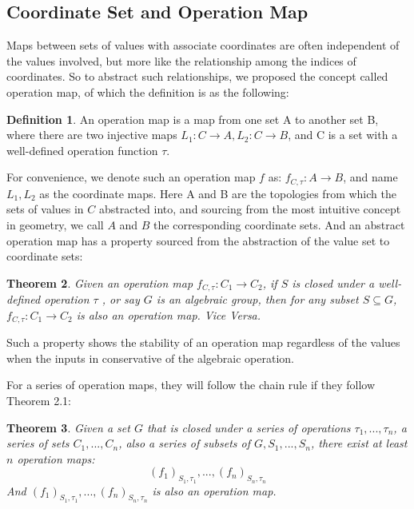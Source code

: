 \documentclass{amsart}
\newtheorem{theorem}{Theorem}[section]
\theoremstyle{definition}
\newtheorem{definition}[theorem]{Definition}
\theoremstyle{remark}
\numberwithin{equation}{section}
\begin{document}
\subsection{Coordinate Set and Operation Map}
Maps between sets of values with associate coordinates are often independent of the values involved, but more like the relationship among the indices of coordinates. So to abstract such relationships, we proposed the concept called operation map, of which the definition is as the following:
\begin{definition}
An operation map is a map from one set A to another set B, where there are two injective maps $L_1:C\to A, L_2:C\to B$, and C is a set with a well-defined operation function $\tau$.
\end{definition}
For convenience, we denote such an operation map $f$ as: $f_{C,\tau}:A\to B$, and name $L_1,L_2$ as the coordinate maps. Here A and B are the topologies from which the sets of values in $C$ abstracted into, and sourcing from the most intuitive concept in geometry, we call $A$ and $B$ the corresponding coordinate sets.
And an abstract operation map has a property sourced from the abstraction of the value set to coordinate sets:\
\begin{theorem}
Given an operation map $f_{C,\tau}:C_1\to C_2$, if $S$ is closed under a well-defined operation $\tau$ , or say $G$ is an algebraic group, then for any subset $S\subseteq G$, $f_{C,\tau}:C_1\to C_2$ is also an operation map. Vice Versa.
\end{theorem}
Such a property shows the stability of an operation map regardless of the values when the inputs in conservative of the algebraic operation.\par
For a series of operation maps, they will follow the chain rule if they follow Theorem 2.1:
\begin{theorem}
Given a set $G$ that is closed under a series of operations $\tau_1,...,\tau_n$, a series of sets $C_1,...,C_n$, also a series of subsets of $G, S_1,...,S_n$, there exist at least $n$ operation maps:
\begin{equation}
(f_1)_{S_1,\tau_1},...,(f_n)_{S_n,\tau_n}
\end{equation}
And $(f_1)_{S_1,\tau_1},...,(f_n)_{S_n,\tau_n}$ is also an operation map.
\end{theorem}
\end{document}
